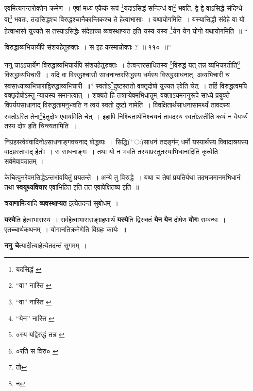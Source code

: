 \documentclass[article,12pt,a4paper]{memoir}
\newcommand{\add}[1]{($^{+}$#1)}
\begin{document}
	एवमित्यनन्तरोक्तेन क्रमेण । एषां मध्य एकैकं रूपं \footnote{यदसिद्धं \cite{dp-msA} \cite{dp-msB} \cite{dp-edP} \cite{dp-edH} \cite{dp-edN}}यदाऽसिद्धं सन्दिग्धं वा\footnote{“वा” नास्ति \cite{dp-msB}} भवति, द्वे द्वे वाऽसिद्धे संदिग्धे वा\footnote{“वा” नास्ति \cite{dp-msB}} भवतः, तदासिद्धश्च विरुद्धश्चानैकान्तिकश्च ते हेत्वाभासाः । यथायोगमिति । यस्यासिद्धौ संदेहे वा यो हेत्वाभासो युज्यते स तस्याऽसिद्धेः संदेहाच्च व्यवस्थाप्यत इति यस्य यस्य \footnote{“येन” नास्ति \cite{dp-msB}}येन येन योगो यथायोगमिति ॥ “
	  
	विरुद्धाव्यभिचार्यपि संशयहेतुरुक्तः । स इह कस्मान्नोक्तः ? ॥ ११० ॥” 
	  
	ननु चाऽऽचार्येण विरुद्धाव्यभिचार्यपि संशयहेतुरुक्तः । हेत्वन्तरसाधितस्य \footnote{०स्य यद्विरुद्धं तन्न \cite{dp-msB} \cite{dp-msD}}विरुद्धं यत् तन्न व्यभिचरतीति\footnote{०रति स विरु० \cite{dp-msA} \cite{dp-msB} \cite{dp-edP} \cite{dp-edH} \cite{dp-edE} \cite{dp-edN}} विरुद्धाव्यभिचारी । यदि वा विरुद्धश्चासौ साधनान्तरसिद्धस्य धर्मस्य विरुद्धसाधनात्, अव्यभिचारी च स्वसाध्याव्यभिचाराद्विरुद्धाव्यभिचारी ॥” स्वतोऽ\footnote{तो}दुष्टस्ततो वक्तृदोषो युज्यत एवेति चेत् । तर्हि विरुद्धत्वमपि वक्तृदोषोऽस्तु न्यायस्य समानत्वात् । शक्यते हि तत्राप्येवमभिधातुम्--वक्ताऽयमननुरूपे साध्ये प्रयुक्ते विपर्ययसाधानाद् विरुद्धतामनुभवति न त्वयं स्वतो दुष्टो नामेति । विवक्षितार्थसाधनासामर्थ्यं तावदस्य स्वतोऽस्ति तेना\footnote{न}हेतुदोष एवायमिति चेत् । इहापि निश्चितार्थनिश्चयनं तावदस्य स्वतोऽस्तीति कथं न वैयर्थ्यं तस्य दोष इति चिन्त्यतामिति ।
	\pend
      

	  \pstart निग्रहस्त्वेवंवादिनोऽसाधनाङ्गवचनाद् बोद्धव्यः । सिद्धि\add{ः}साधनं तदङ्गंम् धर्मो यस्यार्थस्य विवादाश्रयस्य वादप्रस्तावाद् हेतोः । स साधनाङ्गः । तथा यो न भवति तस्याप्रस्तुतस्याभिधानादिति कृत्वेति सर्वमेवावदातम् ।
	\pend
      

	  \pstart केचित्पुनरेवमसिद्धेऽन्तर्भावयितुं प्रयतन्ते । अन्ये तु विरुद्धे । यथा च तेषां प्रयतिर्यथा तदभजमानमभिधानं तथा \textbf{स्वयूथ्यविचार} एवाभिहित इति तत एवापेक्षितव्य इति ॥
	\pend
      

	  \pstart \textbf{त्रयाणामि}त्यादि \textbf{व्यवस्थाप्यत} इत्येतदन्तं सुबोधम् ।
	\pend
      

	  \pstart \textbf{यस्ये}ति हेत्वाभासस्य । सर्वहेत्वाभाससङ्ग्रहणार्थं \textbf{यस्ये}ति द्विरुक्तं \textbf{येन} \leavevmode{} \textbf{येन} दोषेण \textbf{योगः} सम्बन्धः । एतच्चार्थकथनम् । योगानतिक्रमेणेति विग्रहः कार्यः ॥
	\pend
      

	  \pstart \textbf{ननु चे}त्यादीत्याहेत्येतदन्तं सुगमम् ।
	\pend
      \leavevmode{}
	  \bigskip
	  \begingroup
	
\end{document}
